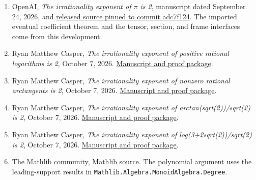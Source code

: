 \documentclass[11pt]{article}
\begin{document}
\begin{enumerate}\small

\item OpenAI, \emph{The irrationality exponent of $\pi$ is 2}, manuscript dated September 24, 2026, and \href{https://github.com/openai/math/tree/adc7f1241b42e322a6451854ab7e4b4c146bf78a/preprints/The-irrationality-exponent-of-pi-is-2-September-24-2026}{released source pinned to commit adc7f124}. The imported eventual coefficient theorem and the tensor, section, and frame interfaces come from this development.

\item Ryan Matthew Casper, \emph{The irrationality exponent of positive rational logarithms is 2}, October 7, 2026. \href{https://github.com/Mattie/math/tree/main/preprints/The-irrationality-exponent-of-positive-rational-logarithms-is-2-October-7-2026}{Manuscript and proof package}.

\item Ryan Matthew Casper, \emph{The irrationality exponent of nonzero rational arctangents is 2}, October 7, 2026. \href{https://github.com/Mattie/math/tree/main/preprints/The-irrationality-exponent-of-nonzero-rational-arctangents-is-2-October-7-2026}{Manuscript and proof package}.

\item Ryan Matthew Casper, \emph{The irrationality exponent of arctan(sqrt(2))/sqrt(2) is 2}, October 7, 2026. \href{https://github.com/Mattie/math/tree/main/preprints/The-irrationality-exponent-of-arctan-sqrt2-over-sqrt2-is-2-October-7-2026}{Manuscript and proof package}.

\item Ryan Matthew Casper, \emph{The irrationality exponent of log(3+2sqrt(2))/sqrt(2) is 2}, October 7, 2026. \href{https://github.com/Mattie/math/tree/main/preprints/The-irrationality-exponent-of-log-3-plus-2-sqrt2-over-sqrt2-is-2-October-7-2026}{Manuscript and proof package}.

\item The Mathlib community, \href{https://github.com/leanprover-community/mathlib4}{Mathlib source}. The polynomial argument uses the leading-support results in \texttt{Mathlib.\allowbreak Algebra.\allowbreak MonoidAlgebra.\allowbreak Degree}.

\end{enumerate}
\end{document}
